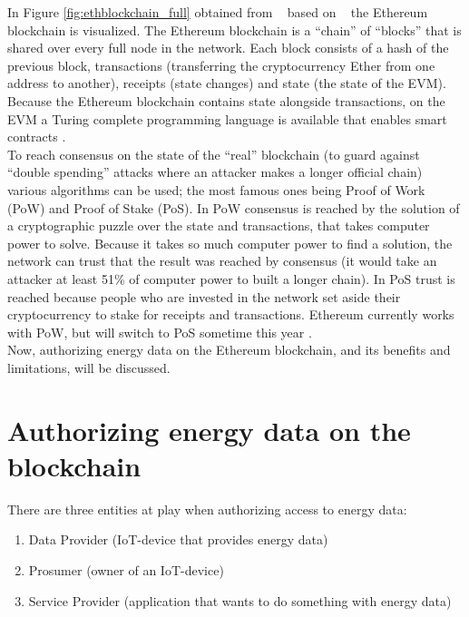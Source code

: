 \documentclass[paper=a4, fontsize=11pt]{scrartcl}
\numberwithin{equation}{section} %
\numberwithin{figure}{section}   %
\numberwithin{table}{section}    %
\begin{document}
In Figure \ref{fig:ethblockchain_full} obtained from ~\cite{ethereum} based on
~\cite{bitcoin} the Ethereum blockchain is visualized. The Ethereum blockchain
is a ``chain'' of ``blocks'' that is shared over every full node in the network.
Each block consists of a hash of the previous block, transactions (transferring
the cryptocurrency Ether from one address to another), receipts (state changes)
and state (the state of the EVM). Because the Ethereum blockchain contains state
alongside transactions, on the EVM a Turing complete programming language is
available that enables smart contracts \cite{ethereum}.\\

To reach consensus on the state of the ``real'' blockchain (to guard against
``double spending'' attacks where an attacker makes a longer official chain)
various algorithms can be used; the most famous ones being Proof of Work (PoW)
and Proof of Stake (PoS). In PoW consensus is reached by the solution of a
cryptographic puzzle over the state and transactions, that takes computer power
to solve. Because it takes so much computer power to find a solution, the
network can trust that the result was reached by consensus (it would take an
attacker at least 51\% of computer power to built a longer chain). In PoS trust
is reached because people who are invested in the network set aside their
cryptocurrency to stake for receipts and transactions. Ethereum currently works
with PoW, but will switch to PoS sometime this year \cite{ethereum}.\\

Now, authorizing energy data on the Ethereum blockchain, and its benefits and
limitations, will be discussed.\\

\section{Authorizing energy data on the blockchain}

There are three entities at play when authorizing access to energy data:

\begin{enumerate}
  \item Data Provider (IoT-device that provides energy data)
  \item Prosumer (owner of an IoT-device)
  \item Service Provider (application that wants to do something with energy data)
\end{enumerate}
\end{document}
